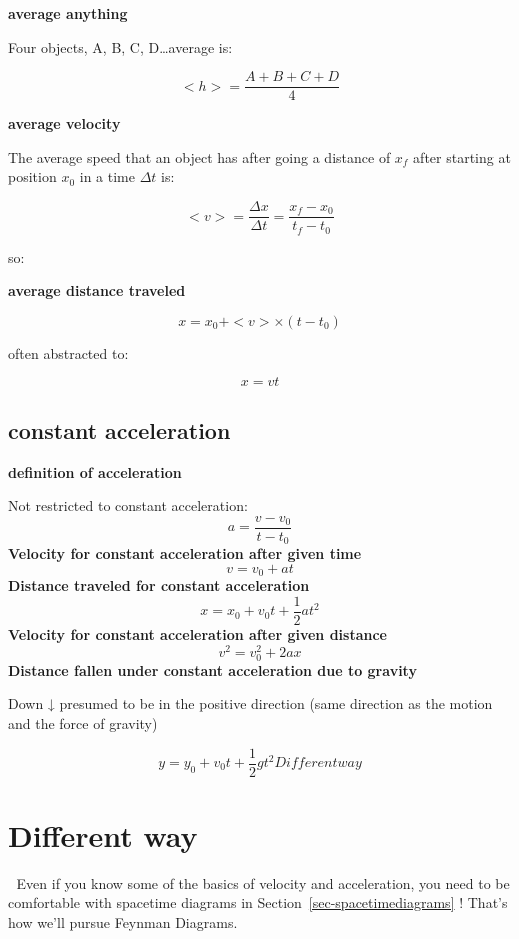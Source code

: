 \documentclass[
  letterpaper,
  DIV=11,
  numbers=noendperiod,
  oneside]{scrreprt}
\begin{document}
\textbf{average anything}

Four objects, A, B, C, D\ldots average is:

\[
<h> = \frac{A+B+C+D}{4}
\]

\textbf{average velocity}

The average speed that an object has after going a distance of \(x_f\)
after starting at position \(x_0\) in a time \(\Delta t\) is:

\[
\begin{equation}
<v> = \frac{\Delta x}{\Delta t} = \frac{x_f-x_0}{t_f - t_0} 
\end{equation}
\]

so:

\textbf{average distance traveled}

\[
x =x_0 +<v>\times(t-t_0)
\]

often abstracted to:

\[
x=vt
\]

\subsection{constant acceleration}\label{constant-acceleration}

\textbf{definition of acceleration}

Not restricted to constant acceleration: \[
a = \frac{v-v_0}{t-t_0}
\] \textbf{Velocity for constant acceleration after given time} \[
v = v_0 +at
\] \textbf{Distance traveled for constant acceleration} \[
x = x_0 + v_0t + \dfrac{1}{2} at^2
\] \textbf{Velocity for constant acceleration after given distance} \[
v^2   = v_0^2 + 2ax
\] \textbf{Distance fallen under constant acceleration due to gravity}

Down ↓ presumed to be in the positive direction (same direction as the
motion and the force of gravity)

\[
y = y_0 + v_0t + \dfrac{1}{2} gt^2Different way
\]

\section{Different way}\label{different-way}

\begin{tcolorbox}[enhanced jigsaw, toprule=.15mm, opacityback=0, colframe=quarto-callout-important-color-frame, rightrule=.15mm, coltitle=black, bottomtitle=1mm, colbacktitle=quarto-callout-important-color!10!white, bottomrule=.15mm, toptitle=1mm, titlerule=0mm, title={Important}, arc=.35mm, leftrule=.75mm, left=2mm, colback=white, breakable, opacitybacktitle=0.6]

🫵 Even if you know some of the basics of velocity and acceleration, you
need to be comfortable with spacetime diagrams in
Section~\ref{sec-spacetimediagrams} ! That's how we'll pursue Feynman
Diagrams.

\end{tcolorbox}
\end{document}
